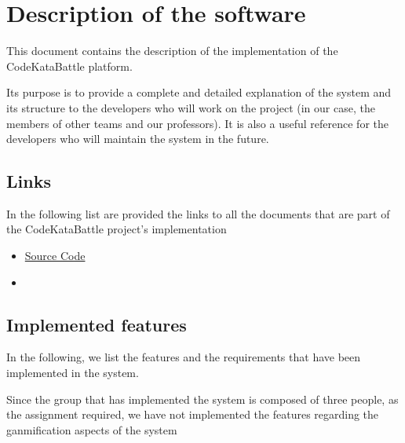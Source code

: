 \chapter{Description of the software}

This document contains the description of the implementation of the CodeKataBattle platform.

Its purpose is to provide a complete and detailed explanation of the system and its structure to the developers who will work on the project (in our case, the members of other teams and our professors). It is also a useful reference for the developers who will maintain the system in the future.

\section{Links}
In the following list are provided the links to all the documents that are part of the CodeKataBattle project's implementation

\begin{itemize}
    \item \href{https://github.com/pontig/sw-eng-2-PasiniPontiggiaStasi/tree/main/ITD/CodeKataBattle}{Source Code}
    \item {\color{red}{executable ready to be run}}
\end{itemize}

\section{Implemented features}

In the following, we list the features and the requirements that have been implemented in the system.

Since the group that has implemented the system is composed of three people, as the assignment required, we have not implemented the features regarding the ganmification aspects of the system

